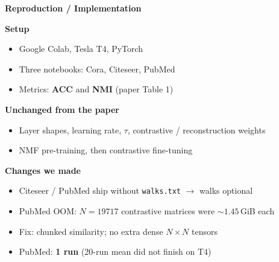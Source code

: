 \documentclass[10pt]{beamer}
\begin{document}
\begin{frame}{\textbf{Reproduction / Implementation}}

\textbf{Setup}
\begin{itemize}
    \item Google Colab, Tesla T4, PyTorch
    \item Three notebooks: Cora, Citeseer, PubMed
    \item Metrics: \textbf{ACC} and \textbf{NMI} (paper Table 1)
\end{itemize}

\vspace{3pt}
\textbf{Unchanged from the paper}
\begin{itemize}
    \item Layer shapes, learning rate, $\tau$, contrastive / reconstruction weights
    \item NMF pre-training, then contrastive fine-tuning
\end{itemize}

\vspace{3pt}
\textbf{Changes we made}
\begin{itemize}
    \item Citeseer / PubMed ship without \texttt{walks.txt} $\rightarrow$ walks optional
    \item PubMed OOM: $N{=}19717$ contrastive matrices were ${\sim}1.45$\,GiB each
    \item Fix: chunked similarity; no extra dense $N\times N$ tensors
    \item PubMed: \textbf{1 run} (20-run mean did not finish on T4)
\end{itemize}
\end{frame}
\end{document}
